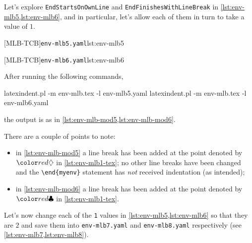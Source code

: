 	Let's explore \texttt{EndStartsOnOwnLine} and \texttt{EndFinishesWithLineBreak} in \cref{lst:env-mlb5,lst:env-mlb6},
	and in particular, let's allow each of them in turn to take a value of $1$.

	\begin{minipage}{.49\textwidth}
		[MLB-TCB]{\texttt{env-mlb5.yaml}}{lst:env-mlb5}
	\end{minipage}
	\hfill
	\begin{minipage}{.49\textwidth}
		[MLB-TCB]{\texttt{env-mlb6.yaml}}{lst:env-mlb6}
	\end{minipage}

	After running the following commands,
	\begin{commandshell}
latexindent.pl -m env-mlb.tex -l env-mlb5.yaml
latexindent.pl -m env-mlb.tex -l env-mlb6.yaml
\end{commandshell}
	the output is as in \cref{lst:env-mlb-mod5,lst:env-mlb-mod6}.

	\begin{sidebyside}
		\begin{minipage}{.42\linewidth}
		\end{minipage}
		\hfill
		\begin{minipage}{.57\linewidth}
		\end{minipage}
	\end{sidebyside}

	There are a couple of points to note:
	\begin{itemize}
		\item in \cref{lst:env-mlb-mod5} a line break has been added at the point denoted by $\EndStartsOnOwnLine$ in \vref{lst:env-mlb1-tex}; no
		      other line breaks have been changed and the \lstinline!\end{myenv}! statement has \emph{not} received indentation (as intended);
		\item in \cref{lst:env-mlb-mod6} a line break has been added at the point denoted by $\EndFinishesWithLineBreak$ in \vref{lst:env-mlb1-tex}.
	\end{itemize}

	Let's now change each of the \texttt{1} values in \cref{lst:env-mlb5,lst:env-mlb6} so that they are $2$ and
	save them into \texttt{env-mlb7.yaml} and \texttt{env-mlb8.yaml} respectively (see \cref{lst:env-mlb7,lst:env-mlb8}).

